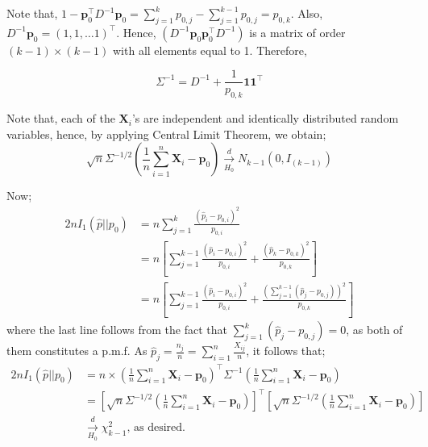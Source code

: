 \documentclass[12pt]{article}
\begin{document}
\begin{enumerate}
\begin{solution}
\begin{enumerate}
	Note that, $1 - \textbf{p}_0^{\intercal}D^{-1}\textbf{p}_0 = \sum_{j=1}^{k}p_{0,j} - \sum_{j=1}^{k-1}p_{0,j} = p_{0,k}$. Also, $D^{-1}\textbf{p}_0 = (1, 1,\dots 1)^{\intercal}$. Hence, $\left(D^{-1}\textbf{p}_0\textbf{p}_0^{\intercal}D^{-1}\right)$ is a matrix of order $(k-1)\times(k-1)$ with all elements equal to 1. Therefore,
	
	$$\Sigma^{-1} = D^{-1} + \frac{1}{p_{0,k}}\textbf{1}\textbf{1}^{\intercal}$$ 
	
	Note that, each of the $\textbf{X}_i$'s are independent and identically distributed random variables, hence, by applying Central Limit Theorem, we obtain;
	$$\sqrt{n}\Sigma^{-1/2}\left(\frac{1}{n}\sum_{i=1}^{n}\textbf{X}_i - \textbf{p}_0\right) \xrightarrow[H_0]{d} N_{k-1}\left(0, I_{(k-1)}\right)$$
	
	Now;
	\begin{align*}
		2nI_1\left(\hat{p} || p_0\right) & = n\sum_{j=1}^{k}\frac{(\hat{p}_i - p_{0,i})^2}{p_{0,i}}\\
		& = n\left[\sum_{j=1}^{k-1}\frac{(\hat{p}_i - p_{0,i})^2}{p_{0,i}} + \frac{(\hat{p}_k - p_{0,k})^2}{p_{0,k}} \right]\\
		& = n\left[\sum_{j=1}^{k-1}\frac{(\hat{p}_i - p_{0,i})^2}{p_{0,i}} + \frac{\left(\sum_{j=1}^{k-1}(\hat{p}_j - p_{0,j})\right)^2}{p_{0,k}} \right]
	\end{align*}
	where the last line follows from the fact that $\sum_{j=1}^{k}(\hat{p}_j-p_{0,j}) = 0$, as both of them constitutes a p.m.f. As $\hat{p}_j = \frac{n_j}{n} = \sum_{i=1}^{n}\frac{X_{ij}}{n}$, it follows that;
	\begin{align*}
		2nI_1\left(\hat{p} || p_0\right) & = n\times \left(\frac{1}{n}\sum_{i=1}^{n}\textbf{X}_i - \textbf{p}_0\right)^{\intercal}\Sigma^{-1}\left(\frac{1}{n}\sum_{i=1}^{n}\textbf{X}_i - \textbf{p}_0\right)\\
		& = \left[\sqrt{n}\Sigma^{-1/2}\left(\frac{1}{n}\sum_{i=1}^{n}\textbf{X}_i - \textbf{p}_0\right)\right]^{\intercal}\left[\sqrt{n}\Sigma^{-1/2}\left(\frac{1}{n}\sum_{i=1}^{n}\textbf{X}_i - \textbf{p}_0\right)\right]\\
		& \xrightarrow[H_0]{d} \chi_{k-1}^{2} \text{, as desired.}
	\end{align*}
	

\end{enumerate}
\end{solution}
\end{enumerate}
\end{document}
